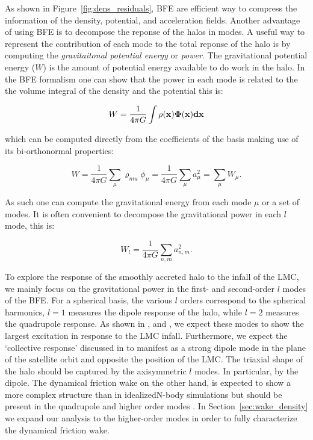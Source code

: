 \documentclass[twocolumn, linenumbers]{openjournal}
\begin{document}
As shown in Figure~\ref{fig:dens_residuals}, BFE are efficient way to compress the information of the
density, potential, and acceleration fields. Another advantage of using BFE is to decompose the 
reponse of the halos in modes. A useful way to represent the contribution of each mode to the total
reponse of the halo is by computing the \textit{gravitaitonal potential energy} or \textit{power}. 
The gravitational potential energy ($W$) is the amount of potential energy 
available to do work in the halo. In the BFE formalism one can show that
the power in each mode is related to the the volume integral of the density 
and the potential this is:

\begin{equation}
    W = \frac{1}{4 \pi G} \int \rho(\bf{x}) \Phi(\bf{x}) d\bf{x}
\end{equation}

which can be computed directly from the coefficients of the basis 
making use of its bi-orthonormal properties:

\begin{equation}
    W = \frac{1}{4 \pi G} \sum_{\mu} \varrho_{mu} \phi_{\mu}  = \frac{1}{4 \pi G} \sum_{\mu} a_{\mu}^2 =  \sum_{\mu} W_{\mu}.
\end{equation}

As such one can compute the gravitational energy from each mode 
$\mu$ or a set of modes. It is often convenient to decompose 
the gravitational power in each $l$ mode, this is:

\begin{equation}
    W_{l} = \frac{1}{4 \pi G} \sum_{n, m} a^2_{n, m}.
\end{equation}

To explore the response of the smoothly accreted halo to the infall of the LMC, we mainly focus
on the gravitational power in the first- and second-order $l$ modes of the BFE. For a
spherical basis, the various $l$ orders correspond to the spherical harmonics, $l=1$ measures
the dipole response of the halo, while $l=2$ measures the quadrupole response. As shown 
in \cite{Petersen_20}, \cite{Garavito_Camargo_2021} and \cite{Lilleengen_23}, we expect 
these modes to show the largest excitation in response to the LMC infall. Furthermore, we 
expect the `collective response' discussed in \cite{Garavito_Camargo_2021} to manifest as 
a strong dipole mode in the plane of the satellite orbit and opposite the position of the LMC. 
The triaxial shape of the halo should be captured by the axisymmetric $l$ modes. In particular, 
by the dipole. The dynamical friction wake on the other hand, is expected to show a more complex 
structure than in idealizedN-body simulations but should be present in the quadrupole and higher order modes 
 \citep{Garavito_Camargo_2021}. In Section~\ref{sec:wake_density} we expand 
our analysis to the higher-order modes in order to fully characterize the dynamical friction 
wake.
\end{document}
